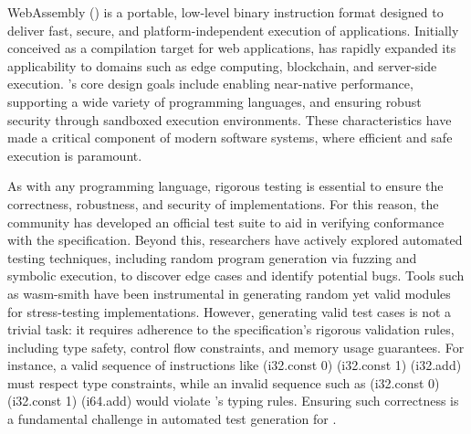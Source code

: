 
WebAssembly (\wasm) is a portable, low-level binary instruction format
designed to deliver fast, secure, and platform-independent execution of applications.
Initially conceived as a compilation target for web applications,
\wasm has rapidly expanded its applicability to domains such as edge computing, blockchain, and server-side execution.
\wasm's core design goals include enabling near-native performance,
supporting a wide variety of programming languages,
and ensuring robust security through sandboxed execution environments.
These characteristics have made \wasm a critical component of
modern software systems, where efficient and safe execution is paramount.

As with any programming language, rigorous testing is essential to ensure the
correctness, robustness, and security of \wasm implementations.
For this reason, the \wasm community has developed an official test suite
to aid in verifying conformance with the specification.
Beyond this, researchers have actively explored automated testing techniques,
including random program generation via fuzzing and symbolic execution,
to discover edge cases and identify potential bugs.
Tools such as wasm-smith have been instrumental in generating
random yet valid \wasm modules for stress-testing implementations.
However, generating valid \wasm test cases is not a trivial task: it requires adherence
to the specification's rigorous validation rules, including type safety,
control flow constraints, and memory usage guarantees.
For instance, a valid sequence of instructions like (i32.const 0) (i32.const 1) (i32.add) must
respect type constraints, while an invalid sequence such as (i32.const 0)
(i32.const 1) (i64.add) would violate \wasm's typing rules.
Ensuring such correctness is a fundamental challenge in automated test generation for \wasm.

